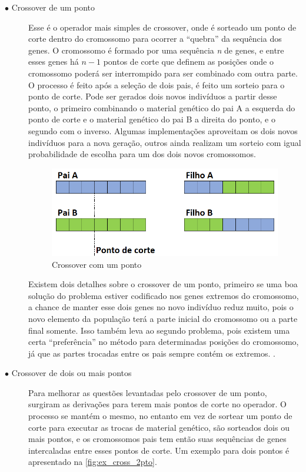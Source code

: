 \begin{description}
\item[$\bullet$ Crossover de um ponto] \text{}

Esse é o operador mais simples de crossover, onde é sorteado um ponto de corte dentro do cromossomo para ocorrer a ``quebra'' da sequência dos genes. O cromossomo é formado por uma sequência \textit{n} de genes, e entre esses genes há \(n-1\) pontos de corte que definem as posições onde o cromossomo poderá ser interrompido para ser combinado com outra parte. O processo é feito após a seleção de dois pais, é feito um sorteio para o ponto de corte. Pode ser gerados dois novos indivíduos a partir desse ponto, o primeiro combinando o material genético do pai A a esquerda do ponto de corte e o material genético do pai B a direita do ponto, e o segundo com o inverso. Algumas implementações aproveitam os dois novos indivíduos para a nova geração, outros ainda realizam um sorteio com igual probabilidade de escolha para um dos dois novos cromossomos.

\begin{figure}[ht]
	\centering
	\includegraphics[width=0.75\linewidth]{imagens/exemplo_cross_1pto.png}
	\caption{Crossover com um ponto}
	\label{fig:ex_cross_1pto}
\end{figure}

Existem dois detalhes sobre o crossover de um ponto, primeiro se uma boa solução do problema estiver codificado nos genes extremos do cromossomo, a chance de manter esse dois genes no novo indivíduo reduz muito, pois o novo elemento da população terá a parte inicial do cromossomo ou a parte final somente. Isso também leva ao segundo problema, pois existem uma certa ``preferência'' no método para determinadas posições do cromossomo, já que as partes trocadas entre os pais sempre contém os extremos. \cite{Mitchell1996}.

\item[$\bullet$ Crossover de dois ou mais pontos] \text{}

Para melhorar as questões levantadas pelo crossover de um ponto, surgiram as derivações para terem mais pontos de corte no operador. O processo se mantém o mesmo, no entanto em vez de sortear um ponto de corte para executar as trocas de material genético, são sorteados dois ou mais pontos, e os cromossomos pais tem então suas sequências de genes intercaladas entre esses pontos de corte. Um exemplo para dois pontos é apresentado na \autoref{fig:ex_cross_2pto}.


\end{description}
